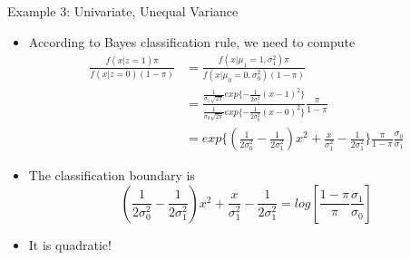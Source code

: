 \documentclass[
  ignorenonframetext,
]{beamer}
\begin{document}
\begin{frame}{Example 3: Univariate, Unequal Variance}
\protect\hypertarget{example-3-univariate-unequal-variance-1}{}
\begin{itemize}
\item
  According to Bayes classification rule, we need to compute
  \[\begin{aligned}
  \frac{f(x|z=1)\pi}{f(x|z=0)(1-\pi)} &=\frac{f(x|\mu_1=1,\sigma_1^2)\pi}{f(x|\mu_0=0, \sigma_0^2)(1-\pi)}\\
  &=\frac{\frac{1}{\sigma_1\sqrt{2\pi}}exp\{-\frac{1}{2\sigma_1^2}(x-1)^2\}}
  {\frac{1}{\sigma_0\sqrt{2\pi}}exp\{-\frac{1}{2\sigma_0^2}(x-0)^2\}}\frac{\pi}{1-\pi}\\
  &= exp\{(\frac{1}{2\sigma_0^2}-\frac{1}{2\sigma_1^2})x^2 + \frac{x}{\sigma_1^2}-\frac{1}{2\sigma_1^2}\}
  \frac{\pi}{1-\pi}\frac{\sigma_0}{\sigma_1}
  \end{aligned}\]
\item
  The classification boundary is
  \[(\frac{1}{2\sigma_0^2}-\frac{1}{2\sigma_1^2})x^2 + \frac{x}{\sigma_1^2}-\frac{1}{2\sigma_1^2}=log[
  \frac{1-\pi}{\pi}\frac{\sigma_1}{\sigma_0}]
  \]
\item
  It is quadratic!
\end{itemize}
\end{frame}
\end{document}
